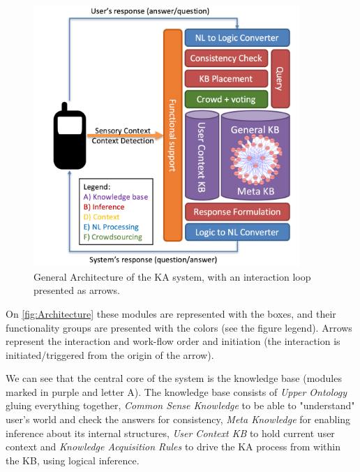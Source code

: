 \begin{figure}[htb]
	\centering
		\includegraphics[width=0.9\textwidth]{figures/architecture.png}
	\caption{General Architecture of the KA system, with an interaction loop
			 presented as arrows.}
	\label{fig:Architecture}
\end{figure}

On \autoref{fig:Architecture} these modules are represented with the boxes,
and their functionality groups are presented with the colors (see the figure
legend). Arrows represent the interaction and work-flow order and initiation 
(the interaction is initiated/triggered from the origin of the arrow).

We can see that the central core of the
system is the knowledge base (modules marked in purple and letter A). The 
knowledge base consists of \emph{Upper Ontology} gluing everything together, 
\emph{Common Sense Knowledge} to be able to "understand" user's world and check
the answers for consistency, \emph{Meta Knowledge} for enabling inference about 
its internal structures, \emph{User Context KB} to hold current user context and 
\emph{Knowledge Acquisition Rules} to drive the KA process from within the KB, 
using logical inference. 

